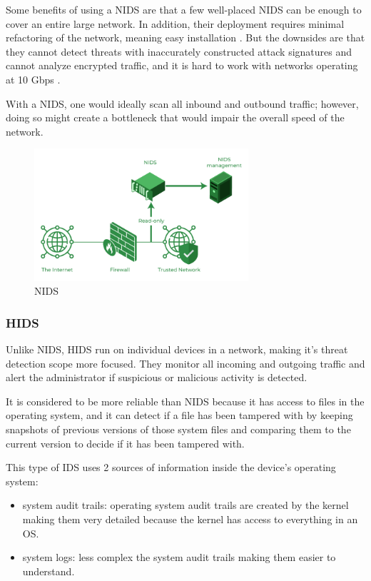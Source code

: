 Some benefits of using a NIDS are that a few well-placed NIDS can be enough to cover an entire large network. In addition, their deployment requires minimal refactoring of the network, meaning easy installation \cite{NIST-IDS}. But the downsides are that they cannot detect threats with inaccurately constructed attack signatures and cannot analyze encrypted traffic, and it is hard to work with networks operating at 10 Gbps \cite{NIDS-ip-tcp}.

With a NIDS, one would ideally scan all inbound and outbound traffic; however, doing so might create a bottleneck that would impair the overall speed of the network.


\begin{figure}[h]
	\centering
	\includegraphics[width=300px]{figures/NIDS.png}
	\caption{NIDS \cite{geeksforgeeks}}
	\label{fig:NIDS}
\end{figure}



\subsubsection{HIDS}
Unlike NIDS, HIDS run on individual devices in a network, making it's threat detection scope more focused. They monitor all incoming and outgoing traffic and alert the administrator if suspicious or malicious activity is detected.

It is considered to be more reliable than NIDS because it has access to files in the operating system, and it can detect if a file has been tampered with by keeping snapshots of previous versions of those system files and comparing them to the current version to decide if it has been tampered with. \cite{NIST-IDS}

This type of IDS uses 2 sources of information inside the device's operating system:

\firmlist
\begin{itemize}
	\item system audit trails: operating system audit trails are created by the kernel making them very detailed because the kernel has access to everything in an OS. \cite{NIST-IDS}
	\item system logs: less complex the system audit trails making them easier to understand. \cite{NIST-IDS}
\end{itemize}



